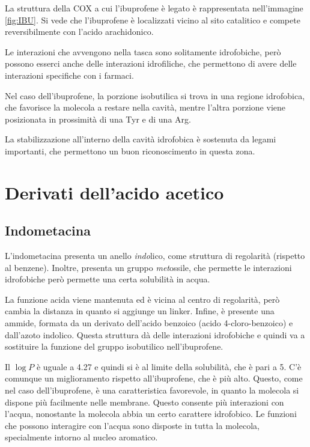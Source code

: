 
La struttura della COX a cui l'ibuprofene è legato è rappresentata nell’immagine
 \ref{fig:IBU}. Si vede che l'ibuprofene è localizzati vicino al sito
catalitico e compete reversibilmente con l'acido arachidonico.

Le interazioni che avvengono nella tasca sono solitamente idrofobiche,
però possono esserci anche delle interazioni idrofiliche, che permettono
di avere delle interazioni specifiche con i farmaci.

Nel caso dell'ibuprofene, la porzione isobutilica si trova in una
regione idrofobica, che favorisce la molecola a restare nella cavità,
mentre l'altra porzione viene posizionata in prossimità di una Tyr e di
una Arg.


La stabilizzazione all'interno della cavità idrofobica è sostenuta da
legami importanti, che permettono un buon riconoscimento in questa
zona.

\section{Derivati dell'acido acetico}

\subsection{Indometacina}

L'indometacina presenta un anello \emph{indo}lico, come struttura di
regolarità (rispetto al benzene). Inoltre, presenta un gruppo
\emph{met}ossile, che permette le interazioni idrofobiche però permette
una certa solubilità in acqua.


La funzione acida viene mantenuta ed è vicina al centro di regolarità,
però cambia la distanza in quanto si aggiunge un linker. Infine, è
presente una ammide, formata da un derivato dell'acido benzoico (acido
4-cloro-benzoico) e dall'azoto indolico. Questa struttura dà delle
interazioni idrofobiche e quindi va a sostituire la funzione del gruppo
isobutilico nell'ibuprofene.

Il \(\log{} P\) è uguale a 4.27 e quindi si è al limite della
solubilità, che è pari a 5. C'è comunque un miglioramento rispetto
all'ibuprofene, che è più alto. Questo, come nel caso dell'ibuprofene, è
una caratteristica favorevole, in quanto la molecola si dispone più
facilmente nelle membrane. Questo consente più interazioni con l'acqua,
nonostante la molecola abbia un certo carattere idrofobico. Le funzioni
che possono interagire con l'acqua sono disposte in tutta la molecola,
specialmente intorno al nucleo aromatico.

